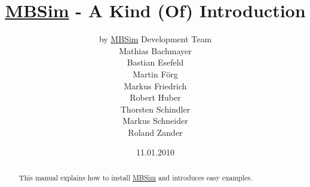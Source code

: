\documentclass[fleqn,11pt]{article}
\newcommand{\MBSim}{\href{http://mbsim.berlios.de}{\textsf{MBSim}}}
\begin{document}
\title{\MBSim{} - A Kind (Of) Introduction}
\author{by \MBSim{} Development Team\\
  Mathias Bachmayer\\
  Bastian Esefeld\\
  Martin F\"org\\
  Markus Friedrich\\
  Robert Huber\\
  Thorsten Schindler\\
  Markus Schneider\\
  Roland Zander}
\date{11.01.2010}
\maketitle

\begin{abstract}
  This manual explains how to install \MBSim{} and introduces easy examples.
\end{abstract}

\noindent\hrulefill
\tableofcontents






\appendix





\end{document}
